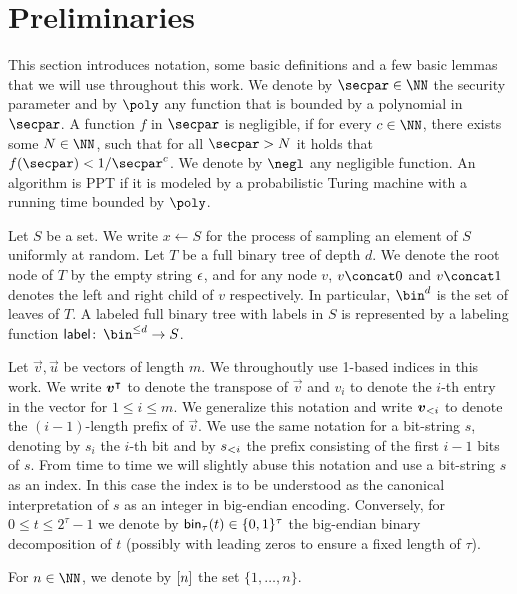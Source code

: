 \section{Preliminaries}\label{sec:prelim}
This section introduces notation, some basic definitions and a few basic lemmas that we will use throughout this work.
We denote by $\secpar\in\NN$ the security parameter and by $\poly$ any function that is bounded by a polynomial in $\secpar$.
A function $f$ in $\secpar$ is negligible, if for every $c \in \NN$, there exists some $N\in\NN$, such that for all $\secpar>N$ it holds that $f(\secpar) < 1/\secpar^c$.
We denote by $\negl$ any negligible function.
An algorithm is PPT if it is modeled by a probabilistic Turing machine with a running time bounded by $\poly$.

Let $S$ be a set.
We write $x\gets S$ for the process of sampling an element of $S$ uniformly at random.
Let $T$ be a full binary tree of depth $d$.
We denote the root node of $T$ by the empty string $\epsilon$, and for any node $v$, $v\concat 0$ and $v\concat 1$ denotes the left and right child of $v$ respectively.
In particular, $\bin^d$ is the set of leaves of $T$.
A labeled full binary tree with labels in $S$ is represented by a labeling function $\lbl\colon\, \bin^{\leq d} \to S$.

Let $\vec{v},\vec{u}$ be vectors of length $m$.
We throughoutly use 1-based indices in this work.
We write $\boldsymbol{v}^\intercal$ to denote the transpose of $\vec{v}$ and $v_i$ to denote the $i$-th entry in the vector for $1\leq i \leq m$.
We generalize this notation and write $\boldsymbol{v}_{<i}$ to denote the $(i-1)$-length prefix of $\vec{v}$.
We use the same notation for a bit-string $s$, denoting by $s_i$ the $i$-th bit and by $s_{<i}$ the prefix consisting of the first $i-1$ bits of $s$.
From time to time we will slightly abuse this notation and use a bit-string $s$ as an index.
In this case the index is to be understood as the canonical interpretation of $s$ as an integer in big-endian encoding.
Conversely, for $0\leq t \leq 2^\tau-1$ we denote by $\mathsf{bin}_{\tau}(t)\in\{0,1\}^\tau$ the big-endian binary decomposition of $t$ (possibly with leading zeros to ensure a fixed length of $\tau$).

For $n\in\NN$, we denote by $[n]$ the set $\{1,\dots,n\}$.


